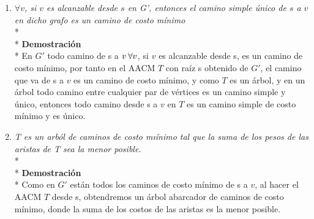 \documentclass{article}
\begin{document}
\begin{enumerate}
        \item \textit{$\forall v$, si $v$ es alcanzable desde $s$ en G', entonces el camino simple \'unico de $s$ a $v$ en dicho grafo es un camino de costo m\'inimo}
        \\*
        \\*
        \textbf{Demostraci\'on } 
        \\*
        En $G'$ todo camino  de s a $v \hspace{0.2em}\forall v$, si $v$ es alcanzable desde s, es un camino de costo m\'inimo, por tanto en el AACM $T$ con ra\'iz s obtenido
        de $G'$, el camino que va de s a $v$ es un camino de costo m\'inimo, y como $T$ es un \'arbol, y en un \'arbol todo camino entre cualquier 
        par de v\'ertices es un camino simple y \'unico, entonces todo camino desde s a $v$ en $T$ es un camino simple de costo m\'inimo y es \'unico.
        \item  \textit{T es un arb\'ol de caminos de costo mı\'inimo tal que la suma de los pesos de las aristas de T sea la menor posible.}
        \\*
        \\*
        \textbf{Demostraci\'on } 
        \\*
        Como en $G'$ est\'an todos los caminos de costo m\'inimo de s a $v$, al hacer el AACM $T$ desde s, obtendremos un \'arbol abarcador de
        caminos de costo m\'inimo, donde la suma de los costos de las aristas es la menor posible.\\
    \end{enumerate}    

    \vspace*{0.5cm} 

\end{document}

